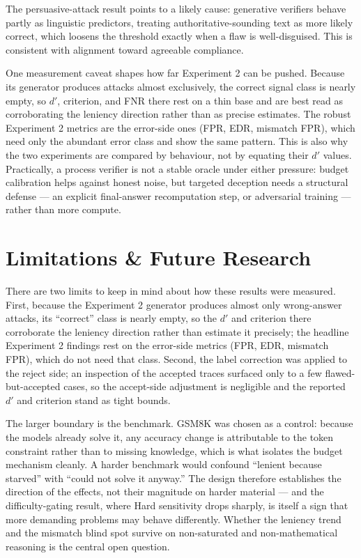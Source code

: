 \documentclass[12pt, a4paper, oneside]{report}
\begin{document}
The persuasive-attack result points to a likely cause: generative verifiers behave partly as linguistic
 predictors, treating authoritative-sounding text as more likely correct, which loosens the threshold
  exactly when a flaw is well-disguised. This is consistent with alignment toward agreeable compliance.

One measurement caveat shapes how far Experiment 2 can be pushed. Because its generator produces 
attacks almost exclusively, the correct signal class is nearly empty, so $d'$, criterion, and FNR 
there rest on a thin base and are best read as corroborating the leniency direction rather than as
 precise estimates. The robust Experiment 2 metrics are the error-side ones (FPR, EDR, mismatch FPR),
  which need only the abundant error class and show the same pattern. This is also why the two experiments
   are compared by behaviour, not by equating their $d'$ values. Practically, a process verifier is not 
   a stable oracle under either pressure: budget calibration helps against honest noise, but targeted 
   deception needs a structural defense --- an explicit final-answer recomputation step, or adversarial
    training --- rather than more compute.



\chapter{Limitations \& Future Research}

There are two limits to keep in mind about how these results were measured. First, because the 
Experiment 2 generator produces almost only wrong-answer attacks, its ``correct'' class is nearly 
empty, so the $d'$ and criterion there corroborate the leniency direction rather than estimate it 
precisely; the headline Experiment 2 findings rest on the error-side metrics (FPR, EDR, mismatch FPR),
 which do not need that class. Second, the label correction was applied to the reject side; an 
 inspection of the accepted traces surfaced only to a few flawed-but-accepted cases, so the 
 accept-side adjustment is negligible and the reported $d'$ and criterion stand as tight bounds.

The larger boundary is the benchmark. GSM8K was chosen as a control: because the models already solve
 it, any accuracy change is attributable to the token constraint rather than to missing knowledge,
  which is what isolates the budget mechanism cleanly. A harder benchmark would confound 
  ``lenient because starved'' with ``could not solve it anyway.'' The design therefore establishes
   the direction of the effects, not their magnitude on harder material --- and the difficulty-gating
    result, where Hard sensitivity drops sharply, is itself a sign  that more demanding problems may behave
     differently. Whether the leniency trend and the mismatch blind spot survive on non-saturated and non-mathematical 
     reasoning is the central open question.
\end{document}
